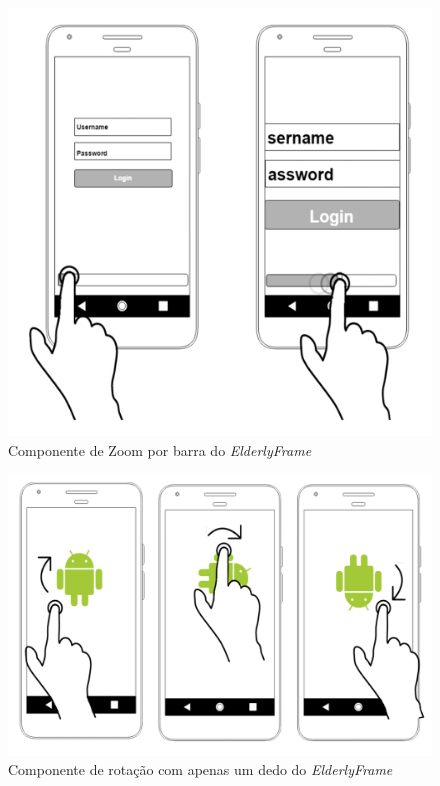 \documentclass[
	12pt,				    %
	openright,			    %
	oneside,			    %
	a4paper,			    %
    sumario=tradicional,    %
	english,			    %
	brazil,				    %
	]{abntex2}              %
\begin{document}
\begin{figure}[H]
	\begin{center}
		\includegraphics[height=0.5\linewidth]{images/zoom-bar.png}
	\end{center}
	\caption[Componente \textit{SeekBarZoom} do \textit{ElderlyFrame}]{Componente de Zoom por barra do \textit{ElderlyFrame}}
	\label{fig:zoomBar}
\end{figure}

\begin{figure}[H]
	\begin{center}
		\includegraphics[height=0.5\linewidth]{images/rotation.png}
	\end{center}
	\caption[Componente \textit{SimpleRotation} do \textit{ElderlyFrame}]{Componente de rotação com apenas um dedo do \textit{ElderlyFrame}}
	\label{fig:rotation}
\end{figure}
\end{document}

